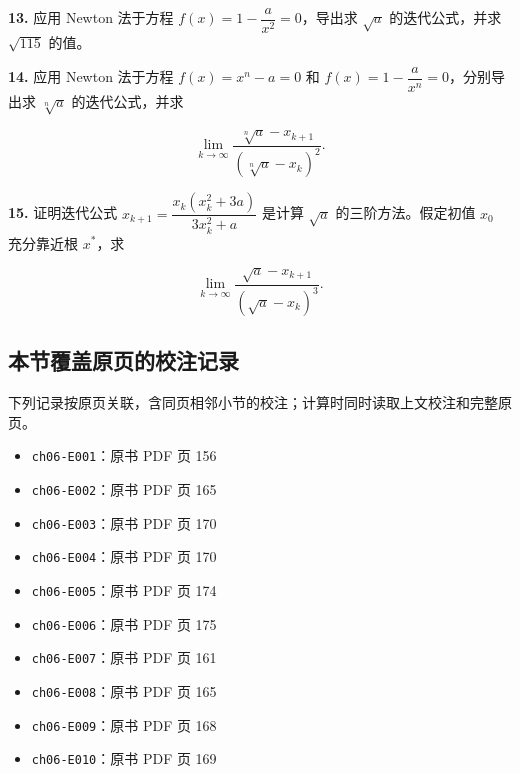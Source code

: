 \documentclass[
  10pt,
  fontset=fandol]{ctexart}
\providecommand{\tightlist}{%
  \setlength{\itemsep}{0pt}\setlength{\parskip}{0pt}}
\begin{document}
\textbf{13.} 应用 Newton 法于方程 \(f(x)=1-\dfrac{a}{x^2}=0\)，导出求 \(\sqrt{a}\) 的迭代公式，并求 \(\sqrt{115}\) 的值。

\textbf{14.} 应用 Newton 法于方程 \(f(x)=x^n-a=0\) 和 \(f(x)=1-\dfrac{a}{x^n}=0\)，分别导出求 \(\sqrt[n]{a}\) 的迭代公式，并求

\[
\lim_{k\to\infty}\frac{\sqrt[n]{a}-x_{k+1}}{(\sqrt[n]{a}-x_k)^2}.
\]

\textbf{15.} 证明迭代公式 \(x_{k+1}=\dfrac{x_k(x_k^2+3a)}{3x_k^2+a}\) 是计算 \(\sqrt{a}\) 的三阶方法。假定初值 \(x_0\) 充分靠近根 \(x^*\)，求

\[
\lim_{k\to\infty}\frac{\sqrt{a}-x_{k+1}}{(\sqrt{a}-x_k)^3}.
\]

\subsection{本节覆盖原页的校注记录}\label{ux672cux8282ux8986ux76d6ux539fux9875ux7684ux6821ux6ce8ux8bb0ux5f55}

下列记录按原页关联，含同页相邻小节的校注；计算时同时读取上文校注和完整原页。

\begin{itemize}
\tightlist
\item
  \texttt{ch06-E001}：原书 PDF 页 156
\item
  \texttt{ch06-E002}：原书 PDF 页 165
\item
  \texttt{ch06-E003}：原书 PDF 页 170
\item
  \texttt{ch06-E004}：原书 PDF 页 170
\item
  \texttt{ch06-E005}：原书 PDF 页 174
\item
  \texttt{ch06-E006}：原书 PDF 页 175
\item
  \texttt{ch06-E007}：原书 PDF 页 161
\item
  \texttt{ch06-E008}：原书 PDF 页 165
\item
  \texttt{ch06-E009}：原书 PDF 页 168
\item
  \texttt{ch06-E010}：原书 PDF 页 169
\end{itemize}
\end{document}
